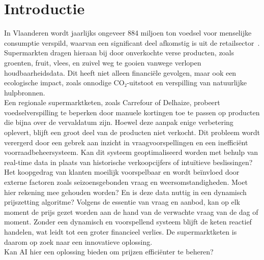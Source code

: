 
\section{Introductie}%
\label{sec:introductie}
In Vlaanderen wordt jaarlijks ongeveer 884 miljoen ton voedsel voor menselijke consumptie verspild, waarvan een significant deel afkomstig is uit de retailsector~\autocite{OVAM}.
Supermarkten dragen hieraan bij door onverkochte verse producten, zoals groenten, fruit, vlees, en zuivel weg te gooien vanwege verlopen houdbaarheidsdata.
Dit heeft niet alleen financiële gevolgen, maar ook een ecologische impact, zoals onnodige CO₂-uitstoot en verspilling van natuurlijke hulpbronnen.
\\
Een regionale supermarktketen, zoals Carrefour of Delhaize, probeert voedselverspilling te beperken door manuele kortingen toe te passen op producten die bijna over de vervaldatum zijn.
Hoewel deze aanpak enige verbetering oplevert, blijft een groot deel van de producten niet verkocht.
Dit probleem wordt verergerd door een gebrek aan inzicht in vraagvoorspellingen en een inefficiënt voorraadbeheersysteem.
Kan dit systeem geoptimaliseerd worden met behulp van real-time data in plaats van historische verkoopcijfers of intuïtieve beslissingen?
\\
Het koopgedrag van klanten moeilijk voorspelbaar en wordt beïnvloed door externe factoren zoals seizoensgebonden vraag en
weersomstandigheden.
Moet hier rekening mee gehouden worden?
En is deze data nuttig in een dynamisch prijszetting algoritme?
Volgens de essentie van vraag en aanbod, kan op elk moment de prijs gezet worden aan de hand van de verwachte vraag van de dag of moment.
Zonder een dynamisch en voorspellend systeem blijft de keten reactief handelen,
wat leidt tot een groter financieel verlies.
De supermarktketen is daarom op zoek naar een innovatieve oplossing.
\\
Kan AI hier een oplossing bieden om prijzen efficiënter te beheren?

